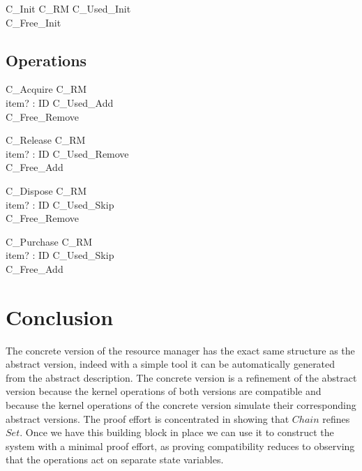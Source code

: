 \documentclass{article}
\begin{document}
\begin{schema}{C\_Init}
	\Delta C\_RM 
\where
	C\_Used\_Init \\
	C\_Free\_Init
\end{schema}

\subsection{Operations}

\begin{schema}{C\_Acquire}
	\Delta C\_RM \\
	item? : ID 
\where
	C\_Used\_Add \\
	C\_Free\_Remove
\end{schema}

\begin{schema}{C\_Release}
	\Delta C\_RM \\
	item? : ID 
\where
	C\_Used\_Remove \\
	C\_Free\_Add
\end{schema}

\begin{schema}{C\_Dispose}
	\Delta C\_RM \\
	item? : ID
\where
	C\_Used\_Skip \\
	C\_Free\_Remove
\end{schema}

\begin{schema}{C\_Purchase}
	\Delta C\_RM \\
	item? : ID
\where
	C\_Used\_Skip \\
	C\_Free\_Add
\end{schema}

\section{Conclusion}

The concrete version of the resource manager has the exact same
structure as the abstract version, indeed with a simple tool it can
be automatically generated from the abstract description. The concrete
version is a refinement of the abstract version because the kernel
operations of both versions are compatible and because the kernel
operations of the concrete version simulate their corresponding abstract
versions. The proof effort is concentrated in showing that $Chain$
refines $Set$. Once we have this building block in place we can use it
to construct the system with a minimal proof effort, as proving
compatibility reduces to observing that the operations act on separate
state variables.
\end{document}
